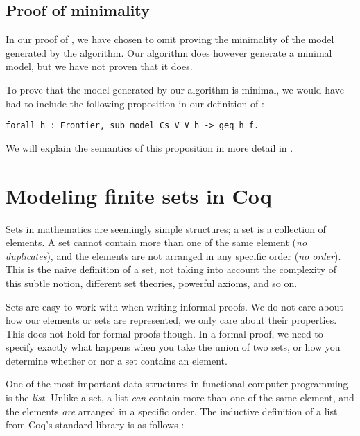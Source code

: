 \subsection{Proof of minimality}
\label{ssec:proof_of_minimality}

In our proof of , we have chosen to omit proving the minimality of the model generated by the algorithm.
Our algorithm does however generate a minimal model, but we have not proven
that it does.

To prove that the model generated by our algorithm is minimal,
we would have had to include the following proposition in our definition of :

\begin{minipage}{\linewidth}
\begin{lstlisting}[language=Coq, label={lst:minimal_model}, caption={Proposition for minimal model}]
forall h : Frontier, sub_model Cs V V h -> geq h f.
\end{lstlisting}
\end{minipage}

We will explain the semantics of this proposition in more detail in .

\section{Modeling finite sets in Coq}
\label{sec:modeling_finite_sets_in_coq}

Sets in mathematics are seemingly simple structures; a set is a collection of elements.
A set cannot contain more than one of the same element (\textit{no duplicates}), and the elements are not arranged in any
specific order (\textit{no order}).
This is the naive definition of a set, not taking into account the complexity of this subtle notion,
different set theories, powerful axioms, and so on.

Sets are easy to work with when writing informal proofs.
We do not care about how our elements or sets are represented, we only care about their properties.
This does not hold for formal proofs though. In a formal proof, we need to specify exactly what happens
when you take the union of two sets, or how you determine whether or nor a set contains an element.

One of the most important data structures in functional computer programming is the \textit{list}.
Unlike a set, a list \textit{can} contain more than one of the same element, and the elements \textit{are} arranged in a
specific order.
The inductive definition of a list from Coq's standard library is as follows \cite{coqdatatypes}:


